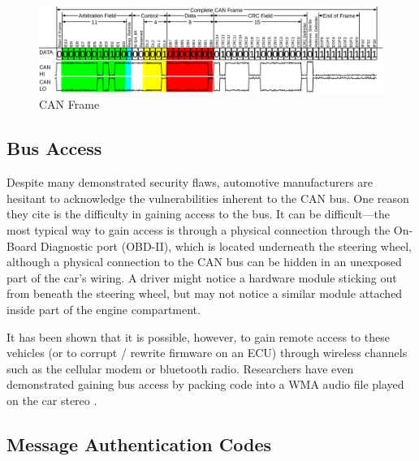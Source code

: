 	\begin{figure}
		\centering
		\includegraphics[width=\linewidth]{figures/can_frame.png}
		\caption{CAN Frame}
	\end{figure}

\subsection{Bus Access}

Despite many demonstrated security flaws, automotive manufacturers are hesitant to acknowledge the vulnerabilities inherent to the CAN bus. One reason they cite is the difficulty in gaining access to the bus. It can be difficult---the most typical way to gain access is through a physical connection through the On-Board Diagnostic port (OBD-II), which is located underneath the steering wheel, although a physical connection to the CAN bus can be hidden in an unexposed part of the car's wiring. A driver might notice a hardware module sticking out from beneath the steering wheel, but may not notice a similar module attached inside part of the engine compartment. 

It has been shown that it is possible, however, to gain remote access to these vehicles (or to corrupt / rewrite firmware on an ECU) through wireless channels such as the cellular modem or bluetooth radio. Researchers have even demonstrated gaining bus access by packing code into a WMA audio file played on the car stereo \cite{Checkoway-2011}.

\subsection{Message Authentication Codes}

